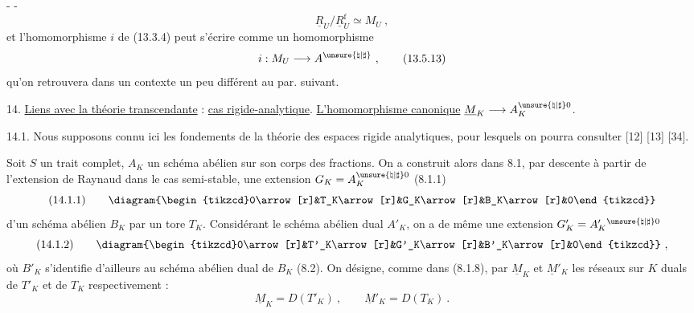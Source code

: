 -  - 
\[
\underline R_U/\underline R_U^{\mathrm f}\simeq M_U\ ,\tag{13.5.12}
\]
et l'homomorphisme $i$ de (13.3.4) peut s'écrire comme un homomorphisme
\[
i:M_U\longrightarrow A^{\unsure{\natural|\sharp}}\ ,\tag{13.5.13}
\]
qu'on retrouvera dans un contexte un peu différent au par. suivant.

14. \uline{Liens avec la théorie transcendante} : \uline{cas rigide-analytique}. \uline{L'homomorphisme canonique} $\underline M_K\longrightarrow A_K^{\unsure{\natural|\sharp}0}$.

14.1. Nous supposons connu ici les fondements de la théorie des espaces rigide analytiques, pour lesquels on pourra consulter [12] [13] [34].

Soit $S$ un trait complet, $A_K$ un schéma abélien sur son corps des fractions. On a construit alors dans 8.1, par descente à partir de l'extension de Raynaud dans le cas semi-stable, une extension $G_K=A_K^{\unsure{\natural|\sharp}0}$ (8.1.1)
\[
\text{(14.1.1)}\qquad
\diagram{\begin{tikzcd}0\arrow[r]&T_K\arrow[r]&G_K\arrow[r]&B_K\arrow[r]&0\end{tikzcd}}
\]
d'un schéma abélien $B_K$ par un tore $T_K$. Considérant le schéma abélien dual $A'_K$, on a de même une extension $G'_K=A_K'{}^{\unsure{\natural|\sharp}0}$
\[
\text{(14.1.2)}\qquad
\diagram{\begin{tikzcd}0\arrow[r]&T'_K\arrow[r]&G'_K\arrow[r]&B'_K\arrow[r]&0\end{tikzcd}}\ ,
\]
où $B'_K$ s'identifie d'ailleurs au schéma abélien dual de $B_K$ (8.2). On désigne, comme dans (8.1.8), par $\underline M_K$ et $\underline M'_K$ les réseaux sur $K$ duals de $T'_K$ et de $T_K$ respectivement :
\[
\underline M_K=D(T'_K)\ ,\qquad \underline M'_K=D(T_K)\ .\tag{14.1.3}
\]
